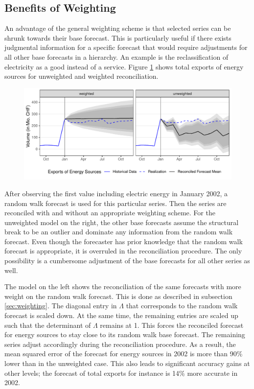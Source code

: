\documentclass[a4paper,fleqn,11pt]{article}
\begin{document}
\subsection{Benefits of Weighting}\label{sec:resweight}

An advantage of the general weighting scheme is that selected series can be shrunk towards their base forecast. This is particularly useful if there exists judgmental information for a specific forecast that would require adjustments for all other base forecasts in a hierarchy. An example is the reclassification of electricity as a good instead of a service. Figure \ref{fig:fcex} shows total exports of energy sources for unweighted and weighted reconciliation.

\begin{figure}[H]
	\includegraphics[width=\textwidth]{fig/fig_electricity}
	\label{fig:fcex}
\end{figure}

After observing the first value including electric energy in January 2002, a random walk forecast is used for this particular series. Then the series are reconciled with and without an appropriate weighting scheme. For the unweighted model on the right, the other base forecasts assume the structural break to be an outlier and dominate any information from the random walk forecast. Even though the forecaster has prior knowledge that the random walk forecast is appropriate, it is overruled in the reconciliation procedure. The only possibility is a cumbersome adjustment of the base forecasts for all other series as well.

The model on the left shows the reconciliation of the same forecasts with more weight on the random walk forecast. This is done as described in subsection \ref{sec:weighting}. The diagonal entry in $\Lambda$ that corresponds to the random walk forecast is scaled down. At the same time, the remaining entries are scaled up such that the determinant of $\Lambda$ remains at 1. This forces the reconciled forecast for energy sources to stay close to its random walk base forecast. The remaining series adjust accordingly during the reconciliation procedure. As a result, the mean squared error of the forecast for energy sources in 2002 is more than 90\% lower than in the unweighted case. This also leads to significant accuracy gains at other levels; the forecast of total exports for instance is 14\% more accurate in 2002.
\end{document}
